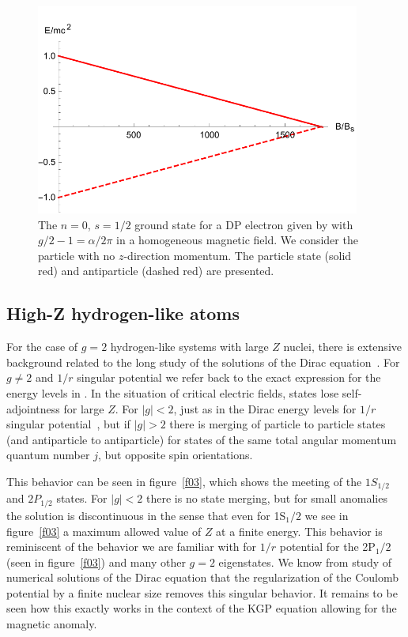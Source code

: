 \begin{figure}[ht]
     \centering
     \includegraphics[clip, trim=0.0cm 0.0cm 0.0cm 0.5cm,width=0.95\textwidth]{plots/chap02moment/lanplot02.pdf}
     \caption{The $n=0$, $s=1/2$ ground state for a DP electron given by  with $g/2-1=\alpha/2\pi$ in a homogeneous magnetic field. We consider the particle with no $z$-direction momentum. The particle state (solid red) and antiparticle (dashed red) are presented.}
     \label{f02}
\end{figure}

\subsection{High-Z hydrogen-like atoms}
\label{sec:sbc}
\noindent For the case of $g\!=\!2$ hydrogen-like systems with large $Z$ nuclei, there is extensive background related to the long study of the solutions of the Dirac equation~\citep{Rafelski:1976ts,Greiner:1985ce,Rafelski:2016ixr}. For $g\ne 2$ and $1/r$ singular potential we refer back to the exact expression for the energy levels in . In the situation of critical electric fields, states lose self-adjointness for large $Z$. For $|g|<2$, just as in the Dirac energy levels for $1/r$ singular potential~\citep{Gesztesy:1984hd}, but if $|g|>2$ there is merging of particle to particle states (and antiparticle to antiparticle) for states of the same total angular momentum quantum number $j$, but opposite spin orientations.

This behavior can be seen in figure~\ref{f03}, which shows the meeting of the $1S_{1/2}$ and $2P_{1/2}$ states. For $|g|<2$ there is no state merging, but for small anomalies the solution is discontinuous in the sense that even for 1S$_1/2$ we see in figure~\ref{f03} a maximum allowed value of $Z$ at a finite energy. This behavior is reminiscent of the behavior we are familiar with for $1/r$ potential for the 2P$_1/2$ (seen in figure~\ref{f03}) and many other $g\!=\!2$ eigenstates. We know from study of numerical solutions of the Dirac equation that the regularization of the Coulomb potential by a finite nuclear size removes this singular behavior. It remains to be seen how this exactly works in the context of the KGP equation allowing for the magnetic anomaly.

